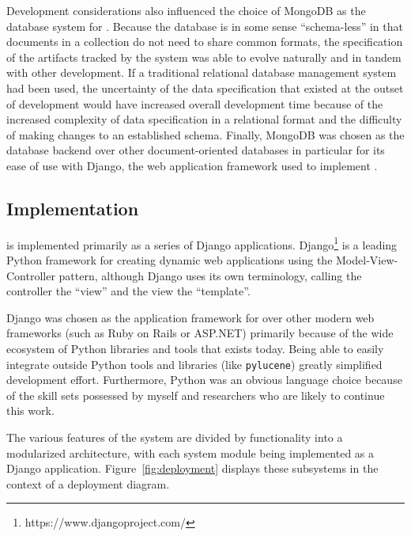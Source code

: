 Development considerations also influenced the choice of MongoDB as the database system for \nplh.  Because the database is in some sense ``schema-less'' in that documents in a collection do not need to share common formats, the specification of the artifacts tracked by the system was able to evolve naturally and in tandem with other development.  If a traditional relational database management system had been used, the uncertainty of the data specification that existed at the outset of development would have increased overall development time because of the increased complexity of data specification in a relational format and the difficulty of making changes to an established schema.  Finally, MongoDB was chosen as the database backend over other document-oriented databases in particular for its ease of use with Django, the web application framework used to implement \nplh.

\subsection {Implementation}

\nplh{} is implemented primarily as a series of Django applications.  Django\footnote{https://www.djangoproject.com/} is a leading Python framework for creating dynamic web applications using the Model-View-Controller pattern\cite{fowler:patterns}, although Django uses its own terminology, calling the controller the ``view'' and the view the ``template''.

Django was chosen as the application framework for \nplh{} over other modern web frameworks (such as Ruby on Rails or ASP.NET) primarily because of the wide ecosystem of Python libraries and tools that exists today.  Being able to easily integrate outside Python tools and libraries (like {\tt pylucene}) greatly simplified development effort.  Furthermore, Python was an obvious language choice because of the skill sets possessed by myself and researchers who are likely to continue this work.

The various features of the system are divided by functionality into a modularized architecture, with each system module being implemented as a Django application.  Figure~\ref{fig:deployment} displays these subsystems in the context of a deployment diagram.  

